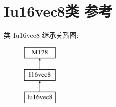 \hypertarget{class_iu16vec8}{}\section{Iu16vec8类 参考}
\label{class_iu16vec8}
类 Iu16vec8 继承关系图\+:\begin{figure}[H]
\begin{center}
\leavevmode
\includegraphics[height=3.000000cm]{class_iu16vec8}
\end{center}
\end{figure}

